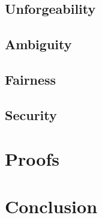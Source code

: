 \documentclass{beamer}
\begin{document}
\subsection{Unforgeability}
% 

\subsection{Ambiguity}
% 

\subsection{Fairness}
% 

\subsection{Security}
% 

\section{Proofs}


\section{Conclusion}

\end{document}
